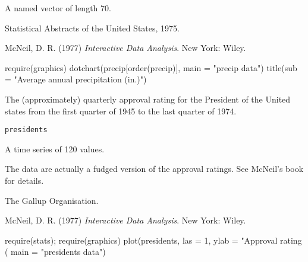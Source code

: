 %
\begin{Format}
A named vector of length 70.
\end{Format}
%
\begin{Source}\relax
Statistical Abstracts of the United States, 1975.
\end{Source}
%
\begin{References}\relax
McNeil, D. R. (1977)
\emph{Interactive Data Analysis}.
New York: Wiley.
\end{References}
%
\begin{Examples}
\begin{ExampleCode}
require(graphics)
dotchart(precip[order(precip)], main = "precip data")
title(sub = "Average annual precipitation (in.)")
\end{ExampleCode}
\end{Examples}
%
\begin{Description}\relax
The (approximately) quarterly approval rating for the President of the
United states from the first quarter of 1945 to the last quarter of
1974.
\end{Description}
%
\begin{Usage}
\begin{verbatim}
presidents
\end{verbatim}
\end{Usage}
%
\begin{Format}
A time series of 120 values.
\end{Format}
%
\begin{Details}\relax
The data are actually a fudged version of the approval ratings.  See
McNeil's book for details.
\end{Details}
%
\begin{Source}\relax
The Gallup Organisation.
\end{Source}
%
\begin{References}\relax
McNeil, D. R. (1977)
\emph{Interactive Data Analysis}.
New York: Wiley.
\end{References}
%
\begin{Examples}
\begin{ExampleCode}
require(stats); require(graphics)
plot(presidents, las = 1, ylab = "Approval rating (%
     main = "presidents data")
\end{ExampleCode}
\end{Examples}
